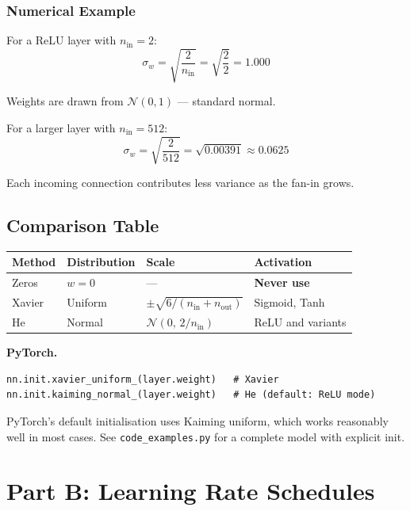 \documentclass[12pt, a4paper]{article}
\newif\ifstudentmode
\newcommand{\sol}[2][6cm]{%
  \ifstudentmode\underline{\hspace{#1}}\else{#2}\fi}
\theoremstyle{definition}
\begin{document}
\subsubsection*{Numerical Example}

For a ReLU layer with $n_{\text{in}} = 2$:
\[
  \sigma_w = \sqrt{\frac{2}{n_{\text{in}}}} = \sqrt{\frac{2}{2}} = \sol[3cm]{1.000}
\]

Weights are drawn from $\mathcal{N}(0, 1)$ --- standard normal.

For a larger layer with $n_{\text{in}} = 512$:
\[
  \sigma_w = \sqrt{\frac{2}{512}} = \sqrt{0.00391} \approx \sol[3cm]{0.0625}
\]

Each incoming connection contributes less variance as the fan-in grows.

\subsection{Comparison Table}

\begin{center}
\renewcommand{\arraystretch}{1.3}
\begin{tabular}{llll}
\toprule
Method & Distribution & Scale & Activation \\
\midrule
Zeros  & $w = 0$ & --- & \textbf{Never use} \\
Xavier & Uniform & $\pm\sqrt{6/(n_{\text{in}}+n_{\text{out}})}$ & Sigmoid, Tanh \\
He     & Normal  & $\mathcal{N}(0,\,2/n_{\text{in}})$ & ReLU and variants \\
\bottomrule
\end{tabular}
\end{center}

\begin{notebox}
\textbf{PyTorch.}
\begin{verbatim}
nn.init.xavier_uniform_(layer.weight)   # Xavier
nn.init.kaiming_normal_(layer.weight)   # He (default: ReLU mode)
\end{verbatim}
PyTorch's default initialisation uses Kaiming uniform, which works
reasonably well in most cases.
See \texttt{code\_examples.py} for a complete model with explicit init.
\end{notebox}

\section{Part B: Learning Rate Schedules}
\end{document}
